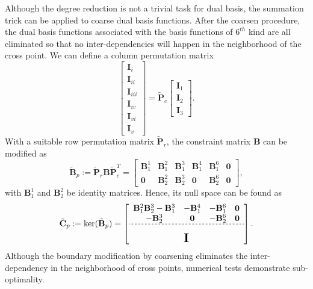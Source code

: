 \documentclass[preprint,12pt]{elsarticle}
\begin{document}
Although the degree reduction is not a trivial task for dual basis, the summation trick can be applied to coarse dual basis functions. After the coarsen procedure, the dual basis functions associated with the basis functions of $6^{th}$ kind are all eliminated so that no inter-dependencies will happen in the neighborhood of the cross point. We can define a column permutation matrix 
\begin{equation}
    \begin{bmatrix}
        \mathbf{I}_{i}\\
        \mathbf{I}_{ii}\\
        \mathbf{I}_{iii}\\
        \mathbf{I}_{iv}\\
        \mathbf{I}_{vi}\\
        \mathbf{I}_{v}
    \end{bmatrix}=
    \tilde{\mathbf{P}}_c
    \begin{bmatrix}
        \mathbf{I}_1\\
        \mathbf{I}_2\\
        \mathbf{I}_3
    \end{bmatrix}.
\end{equation}
With a suitable row permutation matrix $\tilde{\mathbf{P}}_r$, the constraint matrix $\mathbf{B}$ can be modified as
\begin{equation}
    \tilde{\mathbf{B}}_p:=\tilde{\mathbf{P}}_r\mathbf{B}\tilde{\mathbf{P}}_c^T=
    \begin{bmatrix}
        \mathbf{B}_1^1 & \mathbf{B}_1^2 & \mathbf{B}_1^3 & \mathbf{B}_1^4 & \mathbf{B}_1^6 & \mathbf{0} \\
        \mathbf{0} & \mathbf{B}_2^2 & \mathbf{B}_2^3 & \mathbf{0} & \mathbf{B}_2^6 & \mathbf{0}
    \end{bmatrix},
\end{equation}
with $\mathbf{B}_1^1$ and $\mathbf{B}_2^2$ be identity matrices. Hence, its null space can be found as
\begin{equation}
    \tilde{\mathbf{C}}_p:=\ker(\tilde{\mathbf{B}}_p)=
    \left[\begin{array}{cccc}
      \mathbf{B}_1^2\mathbf{B}_2^3-\mathbf{B}_1^3 & -\mathbf{B}_1^4 & -\mathbf{B}_1^6 & \mathbf{0} \\ 
      -\mathbf{B}_2^3 & \mathbf{0} & -\mathbf{B}_2^6 & \mathbf{0} \\ \hdashline[2pt/2pt]
       \multicolumn{4}{c}{\multirow{3}{*}{\raisebox{0mm}{\scalebox{1.5}{$\mathbf{I}$}}}}\\
       & & & 
    \end{array}\right].
\end{equation}
Although the boundary modification by coarsening eliminates the inter-dependency in the neighborhood of cross points, numerical tests demonstrate sub-optimality.  
\end{document}
